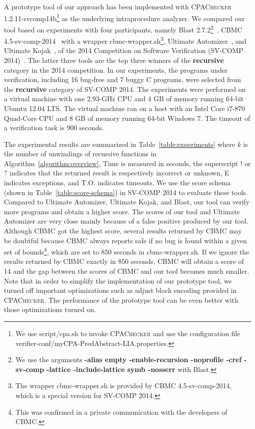 \newcommand{\safe}{S}
\newcommand{\unsafe}{U}
\newcommand{\unknown}{?}
\newcommand{\exception}{E}
\newcommand{\timeout}{T.O.}
\newcommand{\unknownmark}{\ensuremath{^?}}
\newcommand{\wrongmark}{\ensuremath{^!}}

A prototype tool of our approach has been implemented with
\textsc{CPAChecker} 1.2.11-svcomp14b\footnote{We use script/cpa.sh to
  invoke \textsc{CPAChecker} and use the configuration file
  verifier-conf/myCPA-PredAbstract-LIA.properties.} as the underlying
intraprocedure analyzer.
We compared our tool based on experiments with four participants,
namely Blast 2.7.2\footnote{We use the arguments \textbf{-alias empty
    -enable-recursion -noprofile -cref -sv-comp -lattice
    -include-lattice symb -nosserr} with Blast.}~\cite{BeyerHJM07},
CBMC 4.5-sv-comp-2014~\cite{ClarkeKL04} with a wrapper
cbmc-wrapper.sh\footnote{The wrapper cbmc-wrapper.sh is provided by
  CBMC 4.5-sv-comp-2014, which is a special version for SV-COMP
  2014.}, Ultimate Automizer~\cite{HeizmannCDEHLNSP13}, and Ultimate
Kojak~\cite{Kojak}, of the 2014 Competition on Software Verification
(SV-COMP 2014)~\cite{svcomp14}.
The latter three tools are the top three winners of the
\textbf{recursive} category in the 2014 competition.
In our experiments, the programs under verification, including 16
bug-free and 7 buggy C programs, were selected from the
\textbf{recursive} category of SV-COMP 2014.
The experiments were performed on a virtual machine with one 2.93-GHz 
CPU and 4 GB of memory running 64-bit Ubuntu 12.04 LTS.
The virtual machine ran on a host with an Intel Core i7-870 Quad-Core
CPU and 8 GB of memory running 64-bit Windows 7.
The timeout of a verification task is 900 seconds.

The experimental results are summarized in
Table~\ref{table:experiments} where $k$ is the number of unwindings of
recursive functions in Algorithm~\ref{algorithm:overview}, Time is
measured in seconds, the superscript $!$ or $?$ indicates that the
returned result is respectively incorrect or unknown, E indicates
exceptions, and T.O. indicates timeouts.
We use the score schema (shown in Table~\ref{table:score-schema}) in
SV-COMP 2014 to evaluate these tools.
Compared to Ultimate Automizer, Ultimate Kojak, and Blast, our tool
can verify more programs and obtain a higher score.
The scores of our tool and Ultimate Automizer are very close mainly
because of a false positive produced by our tool.
Although CBMC got the highest score, several results returned by CBMC
may be doubtful because CBMC always reports safe if no bug is found
within a given set of bounds\footnote{This was confirmed in a private
  communication with the developers of CBMC.}, which are set to 850
seconds in cbmc-wrapper.sh.
If we ignore the results returned by CBMC exactly in 850 seconds, CBMC 
will obtain a score of 14 and the gap between the scores of CBMC and
our tool becomes much smaller.
Note that in order to simplify the implementation of our prototype
tool, we turned off important optimizations such as adjust block
encoding provided in \textsc{CPAChecker}.
The performance of the prototype tool can be even better with those
optimizations turned on.


